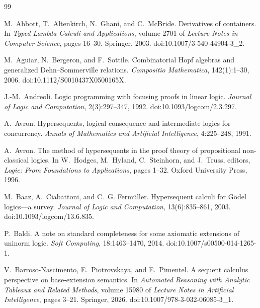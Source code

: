 \documentclass[10pt,a4paper]{article}
\theoremstyle{plain}
\theoremstyle{definition}
\theoremstyle{remark}
\begin{document}
\begin{thebibliography}{99}
\footnotesize
\raggedright
\setlength{\itemsep}{0pt}
\setlength{\parskip}{0pt}

M.~Abbott, T.~Altenkirch, N.~Ghani, and C.~McBride.
\newblock Derivatives of containers.
\newblock In \emph{Typed Lambda Calculi and Applications}, volume 2701 of
\emph{Lecture Notes in Computer Science}, pages 16--30. Springer, 2003.
\newblock doi:10.1007/3-540-44904-3\_2.

M.~Aguiar, N.~Bergeron, and F.~Sottile.
\newblock Combinatorial Hopf algebras and generalized
Dehn--Sommerville relations.
\newblock \emph{Compositio Mathematica}, 142(1):1--30, 2006.
\newblock doi:10.1112/S0010437X0500165X.

J.-M.~Andreoli.
\newblock Logic programming with focusing proofs in linear logic.
\newblock \emph{Journal of Logic and Computation}, 2(3):297--347, 1992.
\newblock doi:10.1093/logcom/2.3.297.

A.~Avron.
\newblock Hypersequents, logical consequence and intermediate logics for
concurrency.
\newblock \emph{Annals of Mathematics and Artificial Intelligence},
4:225--248, 1991.

A.~Avron.
\newblock The method of hypersequents in the proof theory of propositional
non-classical logics.
\newblock In W.~Hodges, M.~Hyland, C.~Steinhorn, and J.~Truss, editors,
\emph{Logic: From Foundations to Applications}, pages 1--32.
Oxford University Press, 1996.

M.~Baaz, A.~Ciabattoni, and C.~G. Ferm\"uller.
\newblock Hypersequent calculi for G\"odel logics---a survey.
\newblock \emph{Journal of Logic and Computation}, 13(6):835--861, 2003.
\newblock doi:10.1093/logcom/13.6.835.

P.~Baldi.
\newblock A note on standard completeness for some axiomatic extensions of
uninorm logic.
\newblock \emph{Soft Computing}, 18:1463--1470, 2014.
\newblock doi:10.1007/s00500-014-1265-1.

V.~Barroso-Nascimento, E.~Piotrovskaya, and E.~Pimentel.
\newblock A sequent calculus perspective on base-extension semantics.
\newblock In \emph{Automated Reasoning with Analytic Tableaux and Related
Methods}, volume 15980 of \emph{Lecture Notes in Artificial Intelligence},
pages 3--21. Springer, 2026.
\newblock doi:10.1007/978-3-032-06085-3\_1.


\end{thebibliography}
\end{document}
